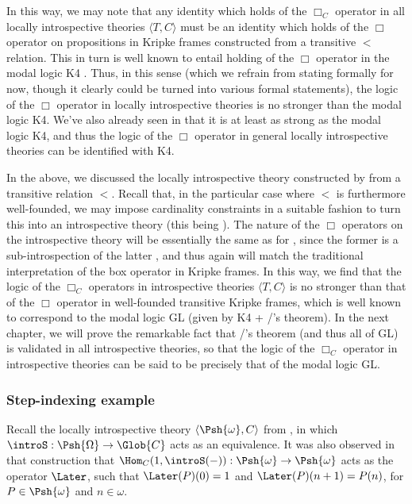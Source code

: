 In this way, we may note that any identity which holds of the $\Box_C$ operator in all locally introspective theories $\langle T, C \rangle$ must be an identity which holds of the $\Box$ operator on propositions in Kripke frames constructed from a transitive $<$ relation. This in turn is well known to entail holding of the $\Box$ operator in the modal logic K4 . Thus, in this sense (which we refrain from stating formally for now, though it clearly could be turned into various formal statements), the logic of the $\Box$ operator in locally introspective theories is no stronger than the modal logic K4. We've also already seen in  that it is at least as strong as the modal logic K4, and thus the logic of the $\Box$ operator in general locally introspective theories can be identified with K4.

In the above, we discussed the locally introspective theory constructed by  from a transitive relation $<$. Recall that, in the particular case where $<$ is furthermore well-founded, we may impose cardinality constraints in a suitable fashion to turn this into an introspective theory (this being ). The nature of the $\Box$ operators on the introspective theory  will be essentially the same as for , since the former is a sub-introspection of the latter , and thus again will match the traditional interpretation of the box operator in Kripke frames. In this way, we find that the logic of the $\Box_C$ operators in introspective theories $\langle T, C \rangle$ is no stronger than that of the $\Box$ operator in well-founded transitive Kripke frames, which is well known to correspond to the modal logic GL (given by K4 + \Loeb/'s theorem). In the next chapter, we will prove the remarkable fact that \Loeb/'s theorem (and thus all of GL) is validated in all introspective theories, so that the logic of the $\Box_C$ operator in introspective theories can be said to be precisely that of the modal logic GL.

\subsubsection{Step-indexing example}\label{StepIndexingModal}
Recall the locally introspective theory $\langle \Psh{\omega}, C \rangle$ from , in which $\introS : \Psh{\Omega} \to \Glob{C}$ acts as an equivalence. It was also observed in that construction that $\Hom_C(1, \introS(-)) : \Psh{\omega} \to \Psh{\omega}$ acts as the operator $\Later$, such that $\Later(P)(0) = 1$ and $\Later(P)(n + 1) = P(n)$, for $P \in \Psh{\omega}$ and $n \in \omega$.

